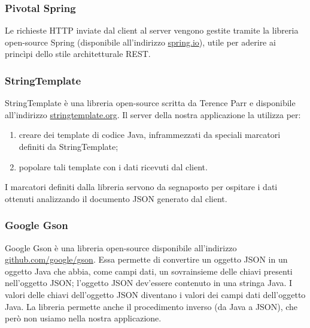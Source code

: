 \subsubsection{Pivotal Spring}
Le richieste HTTP inviate dal client al server vengono gestite tramite la libreria open-source Spring (disponibile all'indirizzo \url{spring.io}), utile per aderire ai princìpi dello stile architetturale REST.

\subsubsection{StringTemplate}
StringTemplate è una libreria open-source scritta da Terence Parr e disponibile all'indirizzo \url{stringtemplate.org}. Il server della nostra applicazione la utilizza per:
\begin{enumerate}
	\item creare dei template di codice Java, inframmezzati da speciali marcatori definiti da StringTemplate;
	\item popolare tali template con i dati ricevuti dal client.
\end{enumerate}
I marcatori definiti dalla libreria servono da segnaposto per ospitare i dati ottenuti analizzando il documento JSON generato dal client.

\subsubsection{Google Gson}
Google Gson è una libreria open-source disponibile all'indirizzo \url{github.com/google/gson}. Essa permette di convertire un oggetto JSON in un oggetto Java che abbia, come campi dati, un sovrainsieme delle chiavi presenti nell'oggetto JSON; l'oggetto JSON dev'essere contenuto in una stringa Java. I valori delle chiavi dell'oggetto JSON diventano i valori dei campi dati dell'oggetto Java. La libreria permette anche il procedimento inverso (da Java a JSON), che però non usiamo nella nostra applicazione.

